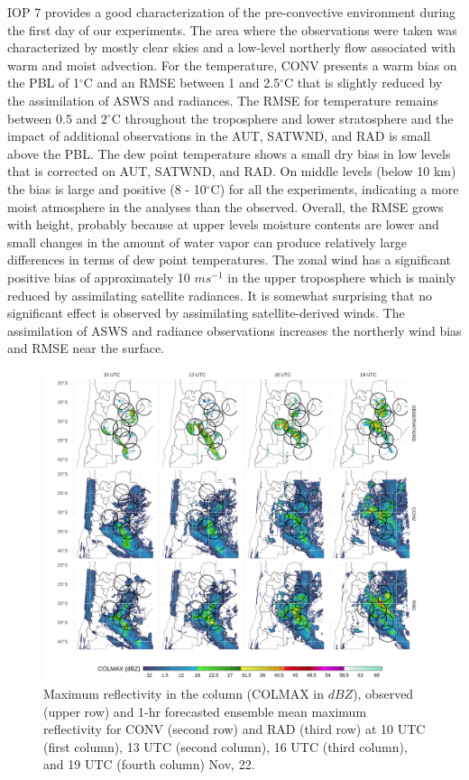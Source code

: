 \documentclass[final,5p,times,twocolumn,authoryear]{elsarticle} %
\begin{document}
IOP 7 provides a good characterization of the pre-convective environment during the first day of our experiments. The area where the observations were taken was characterized by mostly clear skies and a low-level northerly flow associated with warm and moist advection. For the temperature, CONV presents a warm bias on the PBL of 1\(^{\circ}\)C and an RMSE between 1 and 2.5\(^{\circ}\)C that is slightly reduced by the assimilation of ASWS and radiances. The RMSE for temperature remains between 0.5 and 2\(^{\circ}\)C throughout the troposphere and lower stratosphere and the impact of additional observations in the AUT, SATWND, and RAD is small above the PBL. The dew point temperature shows a small dry bias in low levels that is corrected on AUT, SATWND, and RAD. On middle levels (below 10 km) the bias is large and positive (8 - 10\(^{\circ}\)C) for all the experiments, indicating a more moist atmosphere in the analyses than the observed. Overall, the RMSE grows with height, probably because at upper levels moisture contents are lower and small changes in the amount of water vapor can produce relatively large differences in terms of dew point temperatures. The zonal wind has a significant positive bias of approximately 10 \(ms^{-1}\) in the upper troposphere which is mainly reduced by assimilating satellite radiances. It is somewhat surprising that no significant effect is observed by assimilating satellite-derived winds. The assimilation of ASWS and radiance observations increases the northerly wind bias and RMSE near the surface.



\begin{figure}[h]
\includegraphics[width=1\linewidth]{../figures/dbz-mean-1} \caption{Maximum reflectivity in the column (COLMAX in \(dBZ\)), observed (upper row) and 1-hr forecasted ensemble mean maximum reflectivity for CONV (second row) and RAD (third row) at 10 UTC (first column), 13 UTC (second column), 16 UTC (third column), and 19 UTC (fourth column) Nov, 22.}\label{fig:dbz-mean}
\end{figure}
\end{document}
